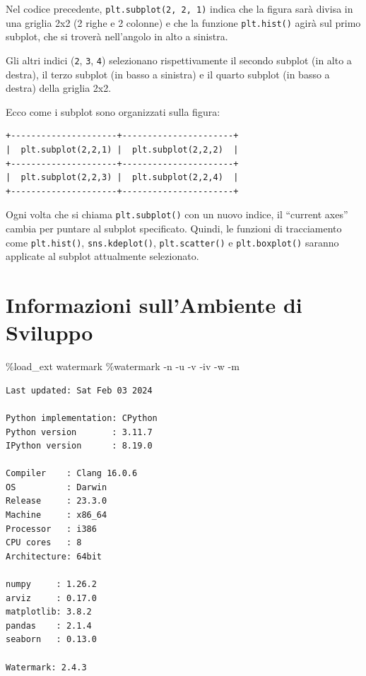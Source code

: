 \documentclass[
  letterpaper,
  krantz2]{{[}./krantz{]}}
\newenvironment{Shaded}{\begin{snugshade}}{\end{snugshade}}
\newcommand{\NormalTok}[1]{\textcolor[rgb]{0.00,0.23,0.31}{#1}}
\newcommand{\OperatorTok}[1]{\textcolor[rgb]{0.37,0.37,0.37}{#1}}
\begin{document}
Nel codice precedente, \texttt{plt.subplot(2,\ 2,\ 1)} indica che la
figura sarà divisa in una griglia 2x2 (2 righe e 2 colonne) e che la
funzione \texttt{plt.hist()} agirà sul primo subplot, che si troverà
nell'angolo in alto a sinistra.

Gli altri indici (\texttt{2}, \texttt{3}, \texttt{4}) selezionano
rispettivamente il secondo subplot (in alto a destra), il terzo subplot
(in basso a sinistra) e il quarto subplot (in basso a destra) della
griglia 2x2.

Ecco come i subplot sono organizzati sulla figura:

\begin{verbatim}
+---------------------+----------------------+
|  plt.subplot(2,2,1) |  plt.subplot(2,2,2)  |
+---------------------+----------------------+
|  plt.subplot(2,2,3) |  plt.subplot(2,2,4)  |
+---------------------+----------------------+
\end{verbatim}

Ogni volta che si chiama \texttt{plt.subplot()} con un nuovo indice, il
``current axes'' cambia per puntare al subplot specificato. Quindi, le
funzioni di tracciamento come \texttt{plt.hist()},
\texttt{sns.kdeplot()}, \texttt{plt.scatter()} e \texttt{plt.boxplot()}
saranno applicate al subplot attualmente selezionato.

\section{Informazioni sull'Ambiente di
Sviluppo}\label{informazioni-sullambiente-di-sviluppo-6}

\begin{Shaded}
\begin{Highlighting}[]
\OperatorTok{\%}\NormalTok{load\_ext watermark}
\OperatorTok{\%}\NormalTok{watermark }\OperatorTok{{-}}\NormalTok{n }\OperatorTok{{-}}\NormalTok{u }\OperatorTok{{-}}\NormalTok{v }\OperatorTok{{-}}\NormalTok{iv }\OperatorTok{{-}}\NormalTok{w }\OperatorTok{{-}}\NormalTok{m}
\end{Highlighting}
\end{Shaded}

\begin{verbatim}
Last updated: Sat Feb 03 2024

Python implementation: CPython
Python version       : 3.11.7
IPython version      : 8.19.0

Compiler    : Clang 16.0.6 
OS          : Darwin
Release     : 23.3.0
Machine     : x86_64
Processor   : i386
CPU cores   : 8
Architecture: 64bit

numpy     : 1.26.2
arviz     : 0.17.0
matplotlib: 3.8.2
pandas    : 2.1.4
seaborn   : 0.13.0

Watermark: 2.4.3
\end{verbatim}
\end{document}
